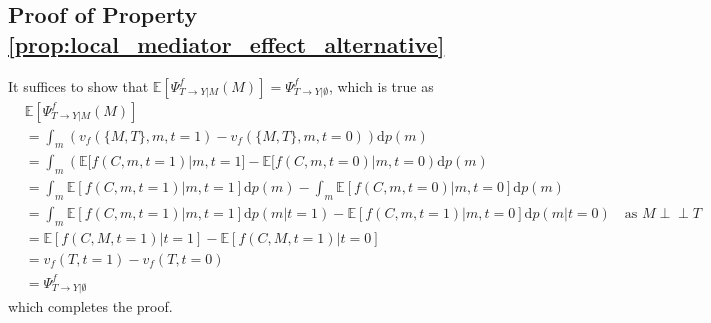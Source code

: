 \documentclass{article}
\theoremstyle{plain}
\theoremstyle{definition}
\theoremstyle{remark}
\newcommand{\effect}{\Psi}
\theoremstyle{mystyle}
\newcommand{\indep}{\perp\!\!\!\!\perp}
\begin{document}
\subsection{Proof of Property \ref{prop:local_mediator_effect_alternative}}
\label{proof:local_mediator_effect_alternative}
It suffices to show that $\mathbb{E}[\effect^{f}_{T \rightarrow Y | M}(M)] = \effect^{f}_{T \rightarrow Y | \emptyset}$, which is true as
\begin{align*}
    &\mathbb{E}[\effect^f_{T \rightarrow Y | M}(M)] \\
    &= \int_{m} (v_f(\{M, T\} , m, t=1) - v_f(\{M, T\} , m, t=0)) \text{d}p(m) \\
        &= \int_{m} (\mathbb{E}[f(C,m,t=1) | m, t=1] - \mathbb{E}[f(C,m,t=0) | m, t=0) \text{d}p(m) \\
    &= \int_{m} \mathbb{E}[f(C,m,t=1) | m, t=1]\text{d}p(m) - \int_{m}\mathbb{E}[f(C,m,t=0) | m, t=0]\text{d}p(m) \\
    &= \int_{m} \mathbb{E}[f(C,m,t=1) | m, t=1]\text{d}p(m|t=1) - \mathbb{E}[f(C,m,t=1) | m, t=0]\text{d}p(m|t=0) \ \ \ \text{ as } M \indep T  \\
        &= \mathbb{E}[f(C,M,t=1) | t=1] - \mathbb{E}[f(C,M,t=1) | t=0] \\
        &=  v_f(T, t=1) - v_f(T, t=0) \\
    &= \effect^{f}_{T \rightarrow Y | \emptyset} 
\end{align*}
which completes the proof.



\vfill
\end{document}
